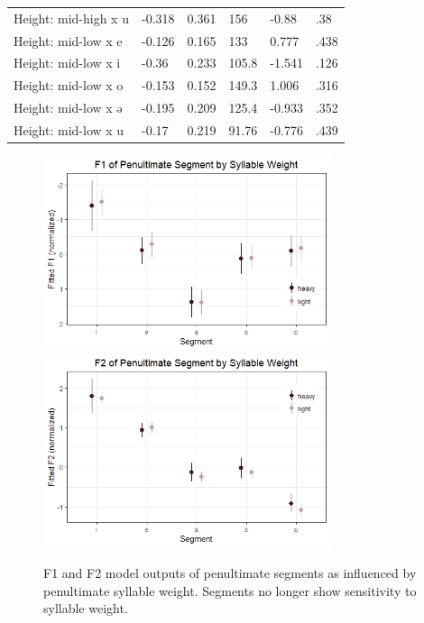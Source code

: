 \documentclass[12pt]{ouparticle}
\begin{document}
\begin{table}[h!]
\begin{tabular}{l | l l l l l}
Height: mid-high x u &  -0.318 & 0.361  & 156      & -0.88   & .38    \\
Height: mid-low x e  &  -0.126 & 0.165  & 133      &  0.777  & .438    \\
Height: mid-low x i  &  -0.36  & 0.233  & 105.8    & -1.541  & .126 \\
Height: mid-low x o  &  -0.153 & 0.152  & 149.3    &  1.006  & .316  \\
Height: mid-low x ə  &  -0.195 & 0.209  & 125.4    & -0.933  & .352    \\
Height: mid-low x u  &  -0.17  & 0.219  & 91.76    & -0.776  & .439   \\

\end{tabular}
\end{table}

\newpage

\begin{figure}[h!]
    \centering
    \caption{F1 and F2 model outputs of penultimate segments as influenced by penultimate syllable weight. Segments no longer show sensitivity to syllable weight.}
    \includegraphics[width=0.75\textwidth]{Figure7.jpg}
    \includegraphics[width=0.75\textwidth]{Figure8.jpg}
    \label{fig:Syll2f1f2_SegWeight}
\end{figure}
\end{document}
